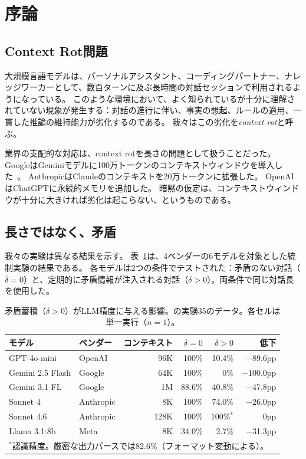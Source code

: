 \documentclass[11pt,a4paper]{article}
\begin{document}
\section{序論}
\label{sec:intro}

\subsection{Context Rot問題}

大規模言語モデルは、パーソナルアシスタント、コーディングパートナー、ナレッジワーカーとして、数百ターンに及ぶ長時間の対話セッションで利用されるようになっている。
このような環境において、よく知られているが十分に理解されていない現象が発生する：対話の進行に伴い、事実の想起、ルールの適用、一貫した推論の維持能力が劣化するのである。
我々はこの劣化を\emph{context rot}と呼ぶ。

業界の支配的な対応は、context rotを長さの問題として扱うことだった。
GoogleはGeminiモデルに100万トークンのコンテキストウィンドウを導入した~\citep{gemini2025}。
AnthropicはClaudeのコンテキストを20万トークンに拡張した。
OpenAIはChatGPTに永続的メモリを追加した。
暗黙の仮定は、コンテキストウィンドウが十分に大きければ劣化は起こらない、というものである。

\subsection{長さではなく、矛盾}

我々の実験は異なる結果を示す。
表~\ref{tab:exp35}は、4ベンダーの6モデルを対象とした統制実験の結果である。
各モデルは2つの条件でテストされた：矛盾のない対話（$\delta = 0$）と、定期的に矛盾情報が注入される対話（$\delta > 0$）。両条件で同じ対話長を使用した。

\begin{table}[htbp]
\centering
\caption{矛盾蓄積（$\delta > 0$）がLLM精度に与える影響。\citet{sunagawa2026collapse}の実験35のデータ。各セルは単一実行（$n = 1$）。}
\label{tab:exp35}
\begin{tabular}{llrrrr}
\toprule
モデル & ベンダー & コンテキスト & $\delta = 0$ & $\delta > 0$ & 低下 \\
\midrule
GPT-4o-mini & OpenAI & 96K & 100\% & 10.4\% & $-$89.6pp \\
Gemini 2.5 Flash & Google & 64K & 100\% & 0\% & $-$100.0pp \\
Gemini 3.1 FL & Google & 1M & 88.6\% & 40.8\% & $-$47.8pp \\
Sonnet 4 & Anthropic & 8K & 100\% & 74.0\% & $-$26.0pp \\
Sonnet 4.6 & Anthropic & 128K & 100\% & 100\%$^*$ & 0pp \\
Llama 3.1:8b & Meta & 8K & 34.0\% & 2.7\% & $-$31.3pp \\
\bottomrule
\multicolumn{6}{l}{\footnotesize $^*$認識精度。厳密な出力パースでは82.6\%（フォーマット変動による）。}
\end{tabular}
\end{table}
\end{document}
